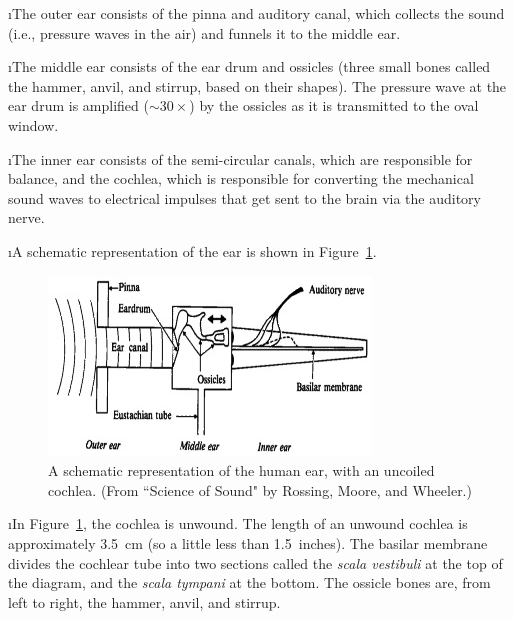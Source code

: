 \i The outer ear consists of the pinna and auditory canal,
which collects the sound (i.e., pressure waves in the air)
and funnels it to the middle ear.

\i The middle ear consists of the ear drum and ossicles
(three small bones called the hammer, anvil, and stirrup,
based on their shapes).
The pressure wave at the ear drum is amplified ($\sim 30\times$) 
by the ossicles as it is transmitted to the oval window.
 
\i The inner ear consists of the semi-circular canals,
which are responsible for balance, and the 
cochlea, which is responsible for converting the mechanical
sound waves to electrical impulses that get sent to the
brain via the auditory nerve.

\i A schematic representation of the ear is shown in
Figure~\ref{f:human-ear-schematic}.
%
\begin{figure}[htbp]
\begin{center}
\includegraphics[width=.8\textwidth]{human-ear-schematic.jpg}
\caption{A schematic representation of the human ear, with an
uncoiled cochlea.
(From ``Science of Sound" by Rossing, Moore, and Wheeler.)}
\label{f:human-ear-schematic}
\end{center}
\end{figure}
%

\i In Figure~\ref{f:human-ear-schematic}, the cochlea is unwound.
The length of an unwound cochlea is approximately 3.5~cm (so a 
little less than 1.5~inches).
The basilar membrane divides the cochlear tube into two sections
called the {\em scala vestibuli} at the top of the diagram, 
and the {\em scala tympani} at the bottom.
The ossicle bones are, from left to right, 
the hammer, anvil, and stirrup.

